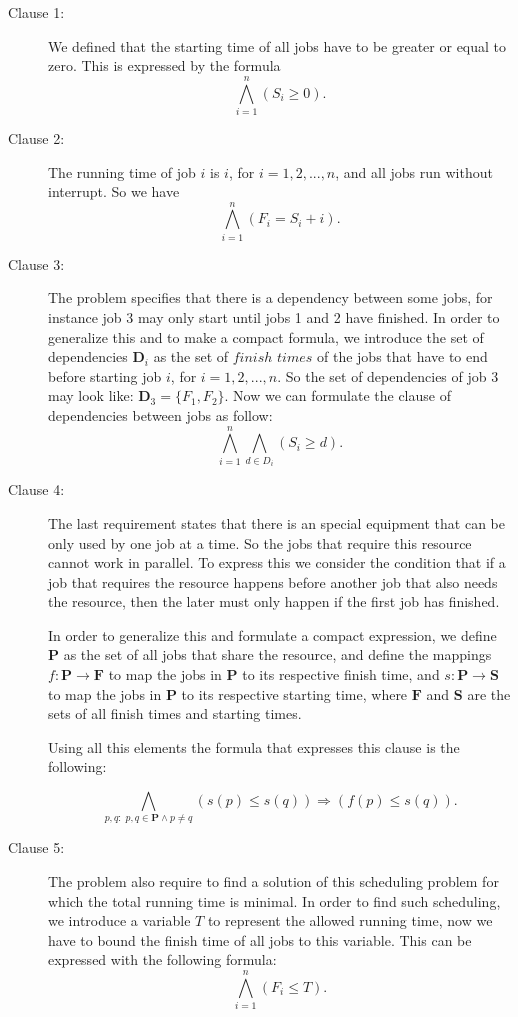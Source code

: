 \begin{description}

  \item[Clause 1:] We defined that the starting time of all jobs have to be greater or equal to zero. This is expressed by the formula
      \[ \bigwedge_{i=1}^n (S_{i} \geq 0).\]

  \item[Clause 2:] The running time of job $i$ is $i$, for $i = 1, 2, . . . , n$, and all jobs run without interrupt. So we have
      \[ \bigwedge_{i=1}^n (F_{i} = S_{i} + i).\]

   \item[Clause 3:] The problem specifies that there is a dependency between some jobs, for instance job 3 may only start until jobs 1 and 2 have finished. In order to generalize this and to make a compact formula, we introduce the set of dependencies $\textbf{D}_{i}$ as the set of $finish$ $times$ of the jobs that have to end before starting job $i$, for $i = 1, 2, . . . , n$. So the set of dependencies of job 3 may look like: $\textbf{D}_{3} = \{ F_{1}, F_{2} \}$. Now we can formulate the clause of dependencies between jobs as follow:
       \[ \bigwedge_{i=1}^n \bigwedge_{d \in D_{i}} (S_{i} \geq d).\]

  \item[Clause 4:] The last requirement states that there is an special equipment that can be only used by one job at a time. So the jobs that require this resource cannot work in parallel. To express this we consider the condition that if a job that requires the resource happens before another job that also needs the resource, then the later must only happen if the first job has finished.

      In order to generalize this and formulate a compact expression, we define $\textbf{P}$ as the set of all jobs that share the resource, and define the mappings $f:\textbf{P} \to \textbf{F}$ to map the jobs in $\textbf{P}$ to its respective finish time, and $s:\textbf{P} \to \textbf{S}$ to map the jobs in $\textbf{P}$ to its respective starting time, where $\textbf{F}$ and $\textbf{S}$ are the sets of all finish times and starting times.

      Using all this elements the formula that expresses this clause is the following:

      \[ \bigwedge_{p,q: \; p,q \in \textbf{P} \land p \neq q} (s(p) \leq s(q)) \Rightarrow (f(p) \leq s(q)) .\]

   \item[Clause 5:] The problem also require to find a solution of this scheduling problem for which the total running time is minimal. In order to find such scheduling, we introduce a variable $T$ to represent the allowed running time, now we have to bound the finish time of all jobs to this variable. This can be expressed with the following formula:
       \[ \bigwedge_{i=1}^n (F_{i} \leq T).\]


\end{description}


